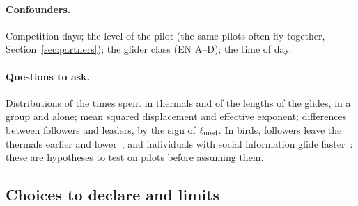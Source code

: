 \paragraph{Confounders.} Competition days; the level of the pilot (the same pilots often fly
together, Section~\ref{sec:partners}); the glider class (EN A--D); the time of day.

\paragraph{Questions to ask.} Distributions of the times spent in thermals and of the lengths of
the glides, in a group and alone; mean squared displacement and effective exponent; differences
between followers and leaders, by the sign of $\ell_{\rm med}$. In birds, followers leave the
thermals earlier and lower~\cite{flack2018}, and individuals with social information glide
faster~\cite{williams2018}: these are hypotheses to test on pilots before assuming them.

\subsection{Choices to declare and limits}\label{sec:parameters}

